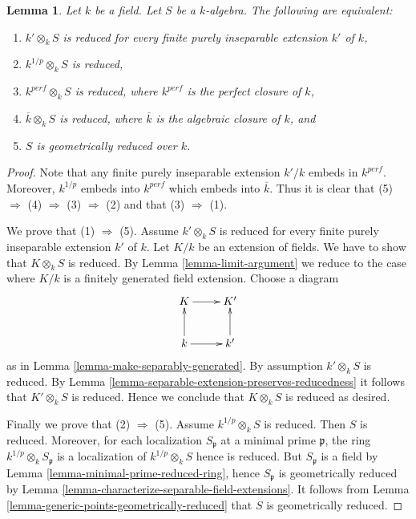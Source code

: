 \documentclass[10pt,a4paper]{amsart}
\theoremstyle{plain}
\newtheorem{lemma}[subsection]{Lemma}
\theoremstyle{definition}
\theoremstyle{remark}
\numberwithin{equation}{subsection}
\begin{document}
\begin{lemma}
\label{lemma-geometrically-reduced-finite-purely-inseparable-extension}
Let $k$ be a field. Let $S$ be a $k$-algebra.
The following are equivalent:
\begin{enumerate}
\item $k' \otimes_k S$ is reduced for every finite
purely inseparable extension $k'$ of $k$,
\item $k^{1/p} \otimes_k S$ is reduced,
\item $k^{perf} \otimes_k S$ is reduced, where $k^{perf}$ is the
perfect closure of $k$,
\item $\overline{k} \otimes_k S$ is reduced, where $\overline{k}$ is the
algebraic closure of $k$, and
\item $S$ is geometrically reduced over $k$.
\end{enumerate}
\end{lemma}

\begin{proof}
Note that any finite purely inseparable extension $k'/k$ embeds
in $k^{perf}$. Moreover, $k^{1/p}$ embeds into $k^{perf}$ which embeds
into $\overline{k}$. Thus it is
clear that (5) $\Rightarrow$ (4) $\Rightarrow$ (3) $\Rightarrow$ (2)
and that (3) $\Rightarrow$ (1).

\medskip\noindent
We prove that (1) $\Rightarrow$ (5).
Assume $k' \otimes_k S$ is reduced for every finite
purely inseparable extension $k'$ of $k$. Let $K/k$ be
an extension of fields. We have to show that $K \otimes_k S$
is reduced. By Lemma \ref{lemma-limit-argument} we reduce to the case where
$K/k$ is a finitely generated field extension. Choose a diagram
$$
\xymatrix{
K \ar[r] & K' \\
k \ar[u] \ar[r] & k' \ar[u]
}
$$
as in Lemma \ref{lemma-make-separably-generated}.
By assumption $k' \otimes_k S$ is reduced.
By Lemma \ref{lemma-separable-extension-preserves-reducedness}
it follows that $K' \otimes_k S$ is reduced.
Hence we conclude that $K \otimes_k S$ is reduced as desired.

\medskip\noindent
Finally we prove that (2) $\Rightarrow$ (5).
Assume $k^{1/p} \otimes_k S$ is reduced. Then $S$ is reduced.
Moreover, for each localization $S_{\mathfrak p}$ at a minimal
prime $\mathfrak p$, the ring $k^{1/p}\otimes_k S_{\mathfrak p}$
is a localization of $k^{1/p} \otimes_k S$ hence is reduced.
But $S_{\mathfrak p}$ is a field by
Lemma \ref{lemma-minimal-prime-reduced-ring},
hence $S_{\mathfrak p}$ is geometrically reduced by
Lemma \ref{lemma-characterize-separable-field-extensions}.
It follows from Lemma \ref{lemma-generic-points-geometrically-reduced}
that $S$ is geometrically reduced.
\end{proof}
\end{document}
